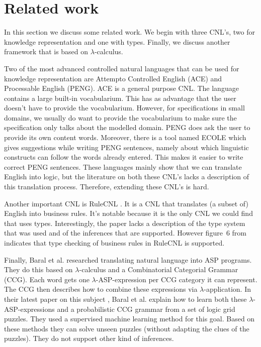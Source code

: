 \section{Related work}
In this section we discuss some related work. We begin with three CNL's, two for knowledge representation and one with types. Finally, we discuss another framework that is based on $\lambda$-calculus.

Two of the most advanced controlled natural languages that can be used for knowledge representation are Attempto Controlled English (ACE) and Processable English (PENG). ACE \cite{Fuchs2008} is a general purpose CNL. The language contains a large built-in vocabularium. This has as advantage that the user doesn't have to provide the vocabularium. However, for specifications in small domains, we usually do want to provide the vocabularium to make sure the specification only talks about the modelled domain. PENG \cite{Schwitter2002} does ask the user to provide its own content words. Moreover, there is a tool named ECOLE which gives suggestions while writing PENG sentences, namely about which linguistic constructs can follow the words already entered. This makes it easier to write correct PENG sentences. These languages mainly show that we can translate English into logic, but the literature on both these CNL's lacks a description of this translation process. Therefore, extending these CNL's is hard.

Another important CNL is RuleCNL \cite{Njonko2014}. It is a CNL that translates (a subset of) English into business rules. It's notable because it is the only CNL we could find that uses types. Interestingly, the paper lacks a description of the type system that was used and of the inferences that are supported. However figure~6 from \cite{Njonko2014} indicates that type checking of business rules in RuleCNL is supported.

Finally, Baral et al. \cite{Baral2008, Baral2012, Baral2012a} researched translating natural language into ASP programs. They do this based on $\lambda$-calculus and a Combinatorial Categorial Grammar (CCG). Each word gets one $\lambda$-ASP-expression per CCG category it can represent. The CCG then describes how to combine these expressions via $\lambda$-application. In their latest paper on this subject \cite{Baral2012a}, Baral et al. explain how to learn both these $\lambda$-ASP-expressions and a probabilistic CCG grammar from a set of logic grid puzzles. They used a supervised machine learning method for this goal. Based on these methods they can solve unseen puzzles (without adapting the clues of the puzzles). They do not support other kind of inferences.

